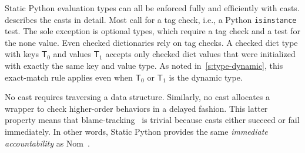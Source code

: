 \documentclass[english,cleveref,submission]{programming}
\newcommand{\SP}{Static Python}
\newcommand{\code}[1]{\texttt{#1}}
\newcommand{\typefont}[1]{\mathsf{#1}}
\newcommand{\spteval}{\typefont{T}}
\begin{document}
\SP{} evaluation types can all be enforced fully and efficiently
with casts.
 describes the casts in detail.
Most call for a tag check, i.e., a Python \code{isinstance} test.
The sole exception is optional types, which require a tag check and a test for the none value.
Even checked dictionaries rely on tag checks.
A checked dict type with keys $\spteval_0$ and values $\spteval_1$ accepts only
checked dict values that were initialized with exactly the same key and value type.
As noted in~\cref{s:type-dynamic}, this exact-match rule applies even when $\spteval_0$
or $\spteval_1$ is the dynamic type.

No cast requires traversing a data structure.
Similarly, no cast allocates a wrapper to check higher-order behaviors in a delayed fashion.
This latter property means that blame-tracking~\cite{ff-icfp-2002} is trivial because
casts either succeed or fail immediately.
In other words, \SP{} provides the same \emph{immediate accountability} as
Nom~\cite{mt-oopsla-2017}.

\end{document}
